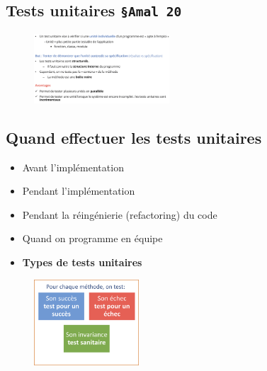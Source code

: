 \documentclass[16pt]{report}
\begin{document}
\begin{multicols*}{2}
       \chapter{Tests unitaires \texttt{\S Amal 20}  }

       \begin{figure}[H]
        \begin{center}
            \includegraphics[width=0.45\textwidth]{testUnitairedef.png}
        \end{center}
       \end{figure}


       \section{Quand effectuer les tests unitaires}
       

       \begin{itemize}
           \item Avant l’implémentation
           \item Pendant l’implémentation
           \item Pendant la réingénierie (refactoring) du code 
           \item Quand on programme en équipe 
       \end{itemize}

        \begin{itemize}
            \item \textbf{Types de tests unitaires}  
        \end{itemize}

       \begin{figure}[H]
        \begin{center}
            \includegraphics[width=0.35\textwidth]{typeTU.png}
       \end{center}
        \end{figure}



\end{multicols*}
\end{document}
